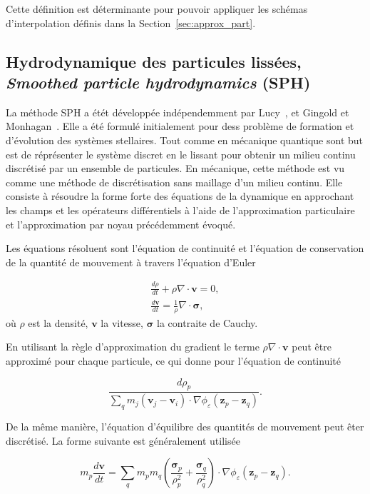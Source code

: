Cette définition est déterminante pour pouvoir appliquer les schémas d'interpolation définis dans la Section~\ref{sec:approx_part}.

\subsection{Hydrodynamique des particules lissées, \textit{Smoothed particle hydrodynamics} (SPH)}

La méthode SPH a étét développée indépendemment par Lucy~\cite{lucy_1977}, et Gingold et Monhagan~\cite{gingold_monaghan_sph_1977}. Elle a été formulé initialement pour dess problème de formation et d'évolution des systèmes stellaires. Tout comme en mécanique quantique sont but est de réprésenter le système discret en le lissant pour obtenir un milieu continu discrétisé par un ensemble de particules. En mécanique, cette méthode est vu comme une méthode de discrétisation sans maillage d'un milieu continu.
Elle consiste à résoudre la forme forte des équations de la dynamique en approchant les champs et les opérateurs différentiels à l'aide de l'approximation particulaire et l'approximation par noyau précédemment évoqué.

Les équations résoluent sont l'équation de continuité et l'équation de conservation de la quantité de mouvement à travers l'équation d'Euler

\begin{eqnarray*}
    \frac{d\rho}{dt} + \rho \nabla \cdot \bm{v} = 0, \\
    \frac{d\bm v}{dt} = \frac1\rho \nabla \cdot \bm \sigma,
\end{eqnarray*}où $\rho$ est la densité, $\bm v$ la vitesse, $\bm \sigma$ la contraite de Cauchy.

En utilisant la règle d'approximation du gradient le terme $\rho \nabla \cdot \bm{v}$ peut être approximé pour chaque particule, ce qui donne pour l'équation de continuité

\begin{equation*}
    \frac{d\rho_p}{\sum_{q} m_j (\bm v_j - \bm v_i) \cdot \nabla \phi_\varepsilon(\bm z_p - \bm z_q)}.
\end{equation*}

De la même manière, l'équation d'équilibre des quantités de mouvement peut êter discrétisé. La forme suivante est généralement utilisée

\begin{equation*}
    m_p \frac{d \bm v}{dt} = \sum_{q} m_p m_q \left(\frac{\bm \sigma_p}{\rho_p^2} + \frac{\bm \sigma_q}{\rho_q^2} \right) \cdot \nabla \phi_\varepsilon(\bm z_p - \bm z_q).
\end{equation*}

